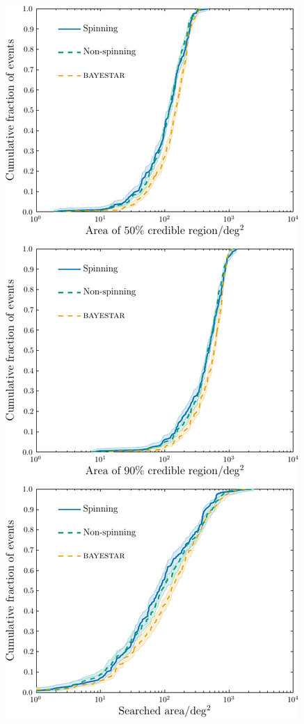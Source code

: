 \documentclass[iop,apj,twocolumn,twocolappendix,numberedappendix]{emulateapj}
\begin{document}
\begin{figure}
  \centering
  \includegraphics[width=0.85\columnwidth]{figures/Fig_3_sky_areas/Fig_3_sky_areas}
  \caption{\protect} 
\end{figure}
\end{document}
